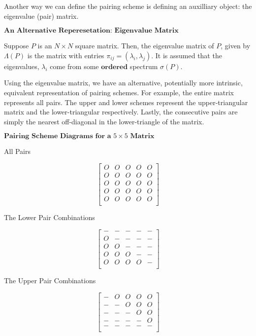 Another way we can define the pairing scheme is defining an auxilliary object: the eigenvalue (pair) matrix.

\begin{center}
$\textbf{An Alternative Reperesetation: Eigenvalue Matrix}$
\end{center}

\begin{definition}
Suppose $P$ is an $N \times N$ square matrix. Then, the eigenvalue matrix of $P$, given by $\Lambda(P)$ is the matrix with entries $\pi_{ij} = (\lambda_i, \lambda_j)$. It is assumed that the eigenvalues, $\lambda_i$ come from some $\textbf{ordered}$ spectrum $\sigma(P)$.
\end{definition}

Using the eigenvalue matrix, we have an alternative, potentially more intrinsic, equivalent representation of pairing schemes. For example, the entire matrix represents all pairs. The upper and lower schemes represent the upper-triangular matrix and the lower-triangular respectively. Lastly, the consecutive pairs are simply the nearest off-diagonal in the lower-triangle of the matrix.

\newpage

\begin{center}
$\textbf{Pairing Scheme Diagrams for a $5 \times 5$ Matrix}$
\end{center}

All Pairs

$$
\begin{bmatrix}
O & O & O & O & O\\
O & O & O & O & O\\
O & O & O & O & O\\
O & O & O & O & O\\
O & O & O & O & O\\
\end{bmatrix}
$$

The Lower Pair Combinations

$$
\begin{bmatrix}
- & - & - & - & -\\
O & - & - & - & -\\
O & O & - & - & -\\
O & O & O & - & -\\
O & O & O & O & -\\
\end{bmatrix}
$$

The Upper Pair Combinations

$$
\begin{bmatrix}
- & O & O & O & O\\
- & - & O & O & O\\
- & - & - & O & O\\
- & - & - & - & O\\
- & - & - & - & -\\
\end{bmatrix}
$$

